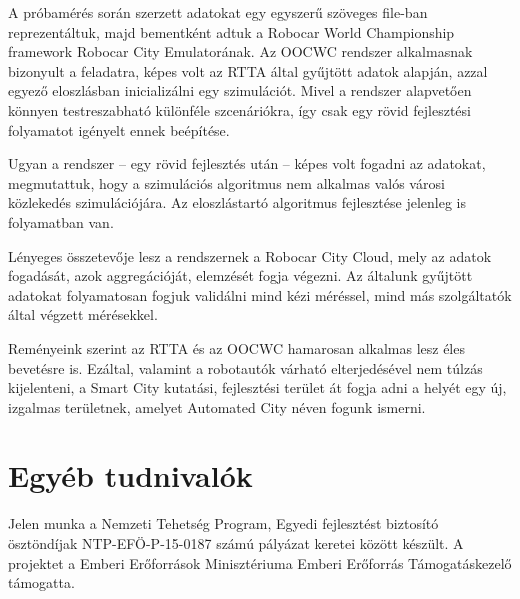 \documentclass[a4paper,12pt]{report}
\begin{document}
A próbamérés során szerzett adatokat egy egyszerű szöveges file-ban reprezentáltuk, majd bementként adtuk a Robocar World Championship framework Robocar City Emulatorának. Az OOCWC rendszer alkalmasnak bizonyult a feladatra, képes volt az RTTA által gyűjtött adatok alapján, azzal egyező eloszlásban inicializálni egy szimulációt. Mivel a rendszer alapvetően könnyen testreszabható különféle szcenáriókra, így csak egy rövid fejlesztési folyamatot igényelt ennek beépítése.

Ugyan a rendszer -- egy rövid fejlesztés után -- képes volt fogadni az adatokat, megmutattuk, hogy a szimulációs algoritmus nem alkalmas valós városi közlekedés szimulációjára. Az eloszlástartó algoritmus fejlesztése jelenleg is folyamatban van. 

Lényeges összetevője lesz a rendszernek a Robocar City Cloud, mely az adatok fogadását, azok aggregációját, elemzését fogja végezni. Az általunk gyűjtött adatokat folyamatosan fogjuk validálni mind kézi méréssel, mind más szolgáltatók által végzett mérésekkel.

Reményeink szerint az RTTA és az OOCWC hamarosan alkalmas lesz éles bevetésre is. Ezáltal, valamint a robotautók várható elterjedésével nem túlzás kijelenteni, a Smart City kutatási, fejlesztési terület át fogja adni a helyét egy új, izgalmas területnek, amelyet Automated City néven fogunk ismerni.




\chapter*{Egyéb tudnivalók}

\noindent
Jelen munka a Nemzeti Tehetség Program, Egyedi fejlesztést biztosító ösztöndíjak NTP-EFÖ-P-15-0187 számú pályázat keretei között készült. A projektet a Emberi Erőforrások Minisztériuma Emberi Erőforrás Támogatáskezelő támogatta.

\begin{figure}[h!]
\centering
{}
\end{figure}
\end{document}
